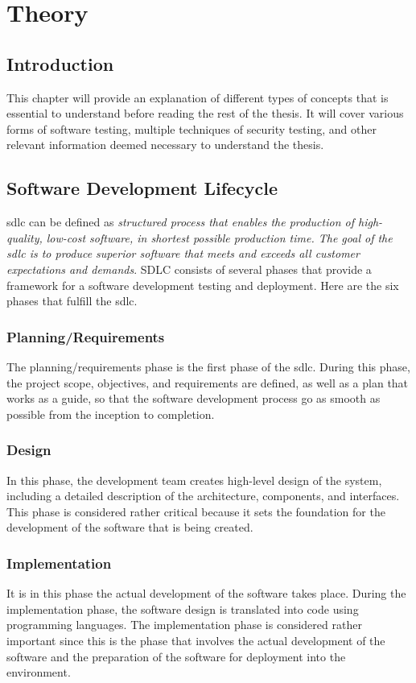 \chapter{Theory}
\label{chap:Theory}

\section{Introduction}
This chapter will provide an explanation of different types of concepts that is essential to understand before reading the rest of the thesis. It will cover various forms of software testing, multiple techniques of security testing, and other relevant information deemed necessary to understand the thesis.


\section{Software Development Lifecycle}
\acrlong{sdlc} can be defined as \textit{structured process that enables the production of high-quality, low-cost software, in shortest possible production time. The goal of the \acrshort{sdlc} is to produce superior software that meets and exceeds all customer expectations and demands}\cite{sdlc}.  SDLC consists of several phases that provide a framework for a software development testing and deployment. Here are the six phases that fulfill the \acrshort{sdlc}. 

  \subsection{Planning/Requirements} 
 The planning/requirements phase is the first phase of the \acrshort{sdlc}. During this phase, the project scope, objectives, and requirements are defined, as well as a plan that works as a guide, so that the software development process go as smooth as possible from the inception to completion. \cite{PlanningSDLC}
 
 \subsection{Design}
 In this phase, the development team creates high-level design of the system, including a detailed description of the architecture, components, and interfaces. This phase is considered rather critical because it sets the foundation for the development of the software that is being created. \cite{DesignSDLC} 
 
 \subsection{Implementation}
 It is in this phase the actual development of the software takes place. During the implementation phase, the software design is translated into code using programming languages. The implementation phase is considered rather important since this is the phase that involves the actual development of the software and the preparation of the software for deployment into the environment. \cite{ImplementationSDLC}
 
